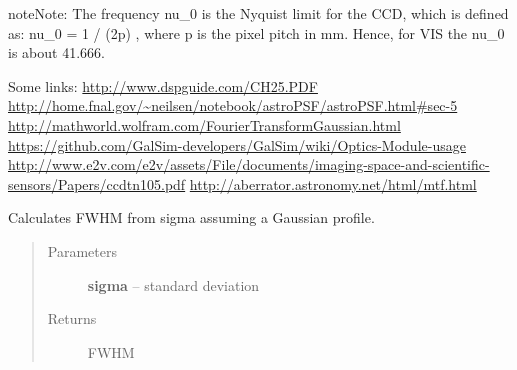 \documentclass[a4paper,11pt,english]{sphinxmanual}
\begin{document}
\begin{notice}{note}{Note:}
The frequency nu\_0 is the Nyquist limit for the CCD, which is defined as:
nu\_0 = 1 / (2p) ,
where p is the pixel pitch in mm. Hence, for VIS the nu\_0 is about 41.666.
\end{notice}

Some links:
\href{http://www.dspguide.com/CH25.PDF}{http://www.dspguide.com/CH25.PDF}
\href{http://home.fnal.gov/~neilsen/notebook/astroPSF/astroPSF.html\#sec-5}{http://home.fnal.gov/\textasciitilde{}neilsen/notebook/astroPSF/astroPSF.html\#sec-5}
\href{http://mathworld.wolfram.com/FourierTransformGaussian.html}{http://mathworld.wolfram.com/FourierTransformGaussian.html}
\href{https://github.com/GalSim-developers/GalSim/wiki/Optics-Module-usage}{https://github.com/GalSim-developers/GalSim/wiki/Optics-Module-usage}
\href{http://www.e2v.com/e2v/assets/File/documents/imaging-space-and-scientific-sensors/Papers/ccdtn105.pdf}{http://www.e2v.com/e2v/assets/File/documents/imaging-space-and-scientific-sensors/Papers/ccdtn105.pdf}
\href{http://aberrator.astronomy.net/html/mtf.html}{http://aberrator.astronomy.net/html/mtf.html}

\begin{fulllineitems}
\label{instrument:sandbox.MTF.FWHM}
Calculates FWHM from sigma assuming a Gaussian profile.
\begin{quote}\begin{description}
\item[{Parameters}] \leavevmode
\textbf{sigma} -- standard deviation

\item[{Returns}] \leavevmode
FWHM

\end{description}\end{quote}

\end{fulllineitems}

\end{document}
